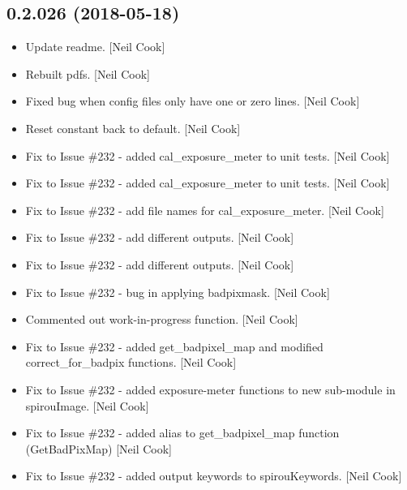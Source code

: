 \documentclass[a4paper,10pt,english]{report}
\begin{document}
\subsection{0.2.026 (2018-05-18)}
\label{\detokenize{misc/changelog:id432}}\begin{itemize}
\item {} 
Update readme. {[}Neil Cook{]}

\item {} 
Rebuilt pdfs. {[}Neil Cook{]}

\item {} 
Fixed bug when config files only have one or zero lines. {[}Neil Cook{]}

\item {} 
Reset constant back to default. {[}Neil Cook{]}

\item {} 
Fix to Issue \#232 - added cal\_exposure\_meter to unit tests. {[}Neil
Cook{]}

\item {} 
Fix to Issue \#232 - added cal\_exposure\_meter to unit tests. {[}Neil
Cook{]}

\item {} 
Fix to Issue \#232 - add file names for cal\_exposure\_meter. {[}Neil Cook{]}

\item {} 
Fix to Issue \#232 - add different outputs. {[}Neil Cook{]}

\item {} 
Fix to Issue \#232 - add different outputs. {[}Neil Cook{]}

\item {} 
Fix to Issue \#232 - bug in applying badpixmask. {[}Neil Cook{]}

\item {} 
Commented out work-in-progress function. {[}Neil Cook{]}

\item {} 
Fix to Issue \#232 - added get\_badpixel\_map and modified
correct\_for\_badpix functions. {[}Neil Cook{]}

\item {} 
Fix to Issue \#232 - added exposure-meter functions to new sub-module
in spirouImage. {[}Neil Cook{]}

\item {} 
Fix to Issue \#232 - added alias to get\_badpixel\_map function
(GetBadPixMap) {[}Neil Cook{]}

\item {} 
Fix to Issue \#232 - added output keywords to spirouKeywords. {[}Neil
Cook{]}


\end{itemize}
\end{document}
